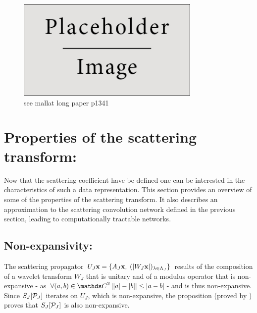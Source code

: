 \documentclass[a4paper,11pt]{report}
\begin{document}
      \begin{figure}
				\begin{center}
					\includegraphics[width=3.5in]{placeholder.jpg}
					\caption[The scattering convolutional network architecture]{see mallat long paper p1341}
					\label{fig:SCN}
				\end{center}	
      \end{figure}
      
      
      
	\section{Properties of the scattering transform:}
		\label{sec:ST/Pties}
		
		Now that the scattering coefficient have be defined one can be interested in the characteristics of such a data representation. This section provides an overview of some of the properties of the scattering transform. It also describes an approximation to the scattering convolution network defined in the previous section, leading to computationally tractable networks. 

		\subsection{Non-expansivity:}
			\label{subsec:ST/Pties/Non-expansivity}
			
			The scattering propagator $U_{J} {\bf x} = \{ A_{J}{\bf x} , \; (\left| W_{J}{\bf x} \right|)_{\lambda \in \Lambda_{J}} \}$ results of the composition of a wavelet transform $W_{J}$ that is unitary and of a modulus operator that is non-expansive - as $\forall (a,b) \in \dsC^{2} \abs{\abs{a}-\abs{b}} \leq \abs{a-b}$- and is thus non-expansive. Since $S_{J}[\mathcal{P}_{J}]$ iterates on $U_{J}$, which is non-expansive, the proposition (proved by \cite{lohmiller1998contraction}) proves that $S_{J}[\mathcal{P}_{J}]$ is also non-expansive.
			
\end{document}
